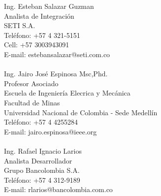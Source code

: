 \begin{resume}
 Ing. Esteban Salazar Guzman\\
 Analista de Integraci\'{o}n  \\
 SETI S.A. \\
 Tel\'{e}fono: +57 4 321-5151 \\
 Cell: +57 3003943091 \\ 
 E-mail: estebansalazar@seti.com.co\\
 \\  
 Ing. Jairo Jos\'{e} Espinosa Msc,Phd.\\
 Profesor Asociado \\
 Escuela de Ingenier\'{i}a Elecrica y Mec\'{a}nica \\
 Facultad de Minas \\
 Universidad Nacional de Colombia - Sede  Medell\'{i}n\\
 Tel\'{e}fono: +57 4 4255284 \\
 E-mail: jairo.espinosa@ieee.org\\
 \\  
 Ing. Rafael Ignacio Larios\\
 Analista Desarrollador \\
 Grupo Bancolombia S.A. \\
 Tel\'{e}fono: +57 4 312-9189  \\
 E-mail: rlarios@bancolombia.com.co \\



\end{resume}
